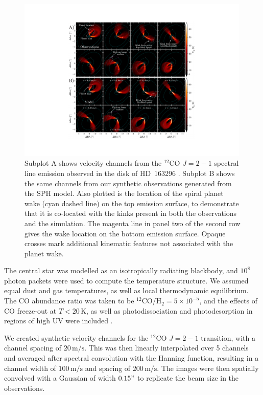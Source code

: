 \begin{figure}[H]
    \centering
    \includegraphics[width = 0.99\textwidth]{figures/calcino_sims.pdf}
    \caption{Subplot A shows velocity channels from the $^{12}$CO $J=2-1$ spectral line emission observed in the disk of HD~163296 \citep{oberg2021}. Subplot B shows the same channels from our synthetic observations generated from the SPH model. Also plotted is the location of the spiral planet wake (cyan dashed line) on the top emission surface, to demonstrate that it is co-located with the kinks present in both the observations and the simulation. The magenta line in panel two of the second row gives the wake location on the bottom emission surface. Opaque crosses mark additional kinematic features not associated with the planet wake.}
    \label{fig:calcino_channels}
\end{figure}

The central star was modelled as an isotropically radiating blackbody, and $10^8$ photon packets were used to compute the temperature structure.
We assumed equal dust and gas temperatures, as well as local thermodynamic equilibrium.
The CO abundance ratio was taken to be $^{12}$CO/H$_2 = 5\times 10^{-5}$, and the effects of CO freeze-out at $T < 20\, \mathrm{K}$, as well as photodissociation and photodesorption in regions of high UV were included \citep{pinte2018}.

We created synthetic velocity channels for the $^{12}$CO $J=2-1$ transition, with a channel spacing of $20 \, \mathrm{m/s}$.
This was then linearly interpolated over 5 channels and averaged after spectral convolution with the Hanning function, resulting in a channel width of $100 \, \mathrm{m/s}$ and spacing of $200 \, \mathrm{m/s}$.
The images were then spatially convolved with a Gaussian of width $0.15"$ to replicate the beam size in the observations.


